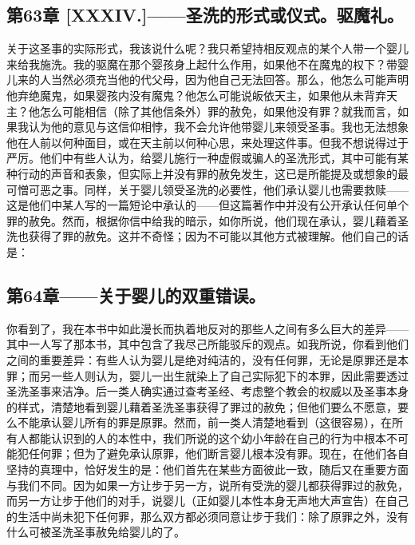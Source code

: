 
\subsection{第63章 [XXXIV.]——圣洗的形式或仪式。驱魔礼。}

关于这圣事的实际形式，我该说什么呢？我只希望持相反观点的某个人带一个婴儿来给我施洗。我的驱魔在那个婴孩身上起什么作用，如果他不在魔鬼的权下？带婴儿来的人当然必须充当他的代父母，因为他自己无法回答。那么，他怎么可能声明他弃绝魔鬼，如果婴孩内没有魔鬼？他怎么可能说皈依天主，如果他从未背弃天主？他怎么可能相信（除了其他信条外）罪的赦免，如果他没有罪？就我而言，如果我认为他的意见与这信仰相悖，我不会允许他带婴儿来领受圣事。我也无法想象他在人前以何种面目，或在天主前以何种心思，来处理这件事。但我不想说得过于严厉。他们中有些人认为，给婴儿施行一种虚假或骗人的圣洗形式，其中可能有某种行动的声音和表象，但实际上并没有罪的赦免发生，这已是所能提及或想象的最可憎可恶之事。同样，关于婴儿领受圣洗的必要性，他们承认婴儿也需要救赎——这是他们中某人写的一篇短论中承认的——但这篇著作中并没有公开承认任何单个罪的赦免。然而，根据你信中给我的暗示，如你所说，他们现在承认，婴儿藉着圣洗也获得了罪的赦免。这并不奇怪；因为不可能以其他方式被理解。他们自己的话是：\par


\subsection{第64章——关于婴儿的双重错误。}

你看到了，我在本书中如此漫长而执着地反对的那些人之间有多么巨大的差异——其中一人写了那本书，其中包含了我尽己所能驳斥的观点。如我所说，你看到他们之间的重要差异：有些人认为婴儿是绝对纯洁的，没有任何罪，无论是原罪还是本罪；而另一些人则认为，婴儿一出生就染上了自己实际犯下的本罪，因此需要透过圣洗圣事来洁净。后一类人确实通过查考圣经、考虑整个教会的权威以及圣事本身的样式，清楚地看到婴儿藉着圣洗圣事获得了罪过的赦免；但他们要么不愿意，要么不能承认婴儿所有的罪是原罪。然而，前一类人清楚地看到（这很容易），在所有人都能认识到的人的本性中，我们所说的这个幼小年龄在自己的行为中根本不可能犯任何罪；但为了避免承认原罪，他们断言婴儿根本没有罪。现在，在他们各自坚持的真理中，恰好发生的是：他们首先在某些方面彼此一致，随后又在重要方面与我们不同。因为如果一方让步于另一方，说所有受洗的婴儿都获得罪过的赦免，而另一方让步于他们的对手，说婴儿（正如婴儿本性本身无声地大声宣告）在自己的生活中尚未犯下任何罪，那么双方都必须同意让步于我们：除了原罪之外，没有什么可被圣洗圣事赦免给婴儿的了。\par

